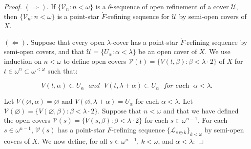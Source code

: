 \documentclass[main.tex]{subfiles}
\begin{document}
\begin{proof}
$(\Rightarrow)$. If $\{\mathscr{V}_n: n < \omega\}$ is a $\theta$-sequence of open refinement of a 
cover $\mathscr{U}$, then $\{\mathscr{V}_n: n < \omega\}$ is a point-star $\dot{F}$-refining
sequence for $\mathscr{U}$ by semi-open covers of $X$.

$(\Leftarrow)$. Suppose that every open $\lambda$-cover has a point-star $\dot{F}$-refining 
sequence by semi-open covers, and that $\mathscr{U} = \{U_\alpha: \alpha < \lambda\}$ 
be an open cover of $X$. We use induction on $n < \omega$ to define open covers 
$\mathscr{V}(t) = \{V(t, \beta): \beta < \lambda \cdot 2\}$ of $X$ for 
$t \in \omega^n \subset \omega^{<\omega}$ such that:
 
\begin{equation}
V(t, \alpha) \subset U_\alpha \; \textit{ and } \; V(t, \lambda+\alpha) \subset U_\alpha 
\; \textit{ for each } \; \alpha < \lambda.      \label{eq:4.1.2.1}
\end{equation}

\noindent Let $V(\varnothing, \alpha) = \varnothing$ and $V(\varnothing, \lambda + \alpha) = U_\alpha$ 
for each $\alpha < \lambda$. 
Let $\mathscr{V}(\varnothing) = \{V(\varnothing, \beta): \beta < \lambda \cdot 2\}$. 
Suppose that $n < \omega$ and that we have defined the open covers 
$\mathscr{V}(s) = \{V(s, \beta): \beta < \lambda \cdot 2\}$ for each $s \in \omega^{n-1}$.
For each $s \in \omega^{n-1}$, $\mathscr{V}(s)$ has a point-star $\dot{F}$-refining sequence $\{\mathscr{L}_{s \oplus k}\}_{k < \omega}$ by semi-open covers of $X$. 
We now define, for all $s \in \omega^{n-1}$, $k < \omega$, and $\alpha < \lambda$:


\end{proof}
\end{document}
